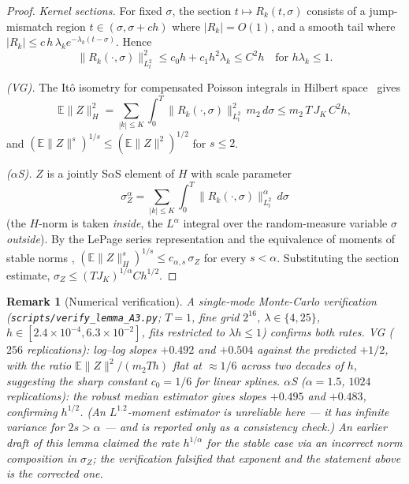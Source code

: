 \documentclass[review,12pt]{elsarticle}
\newtheorem{remark}{Remark}
\begin{document}
\begin{proof}
\emph{Kernel sections.} For fixed $\sigma$, the section
$t \mapsto R_k(t, \sigma)$ consists of a jump-mismatch region
$t \in (\sigma, \sigma + ch)$ where $|R_k| = O(1)$, and a smooth tail
where $|R_k| \le c\,h\,\lambda_k e^{-\lambda_k(t-\sigma)}$. Hence
\[
\|R_k(\cdot, \sigma)\|_{L^2_t}^2 \le c_0 h + c_1 h^2 \lambda_k
\le C^2 h
\quad\text{for } h\lambda_k \le 1.
\]

\emph{(VG).} The It\^o isometry for compensated Poisson integrals in
Hilbert space~\cite{PeszatZabczyk2007} gives
\[
\mathbb E\|Z\|_H^2 = \sum_{|k|\le K}\int_0^T
\|R_k(\cdot,\sigma)\|_{L^2_t}^2\, m_2\, d\sigma
\le m_2\, T\, J_K\, C^2 h,
\]
and $(\mathbb E\|Z\|^s)^{1/s} \le (\mathbb E\|Z\|^2)^{1/2}$ for
$s \le 2$.

\emph{($\alpha$S).} $Z$ is a jointly S$\alpha$S element of $H$ with
scale parameter
\[
\sigma_Z^\alpha = \sum_{|k| \le K}\int_0^T
\bigl\|R_k(\cdot, \sigma)\bigr\|_{L^2_t}^{\alpha}\, d\sigma
\]
(the $H$-norm is taken \emph{inside}, the $L^\alpha$ integral over
the random-measure variable $\sigma$ \emph{outside}). By the LePage
series representation and the equivalence of moments of stable norms
\cite[Ch.~3]{SamorodnitskyTaqqu1994}\cite[Ch.~5]{LedouxTalagrand1991},
$(\mathbb E\|Z\|_H^s)^{1/s} \le c_{\alpha,s}\,\sigma_Z$ for every
$s < \alpha$. Substituting the section estimate,
$\sigma_Z \le (T J_K)^{1/\alpha} C h^{1/2}$.
\end{proof}

\begin{remark}[Numerical verification]\label{rem:lemA3-verify}
A single-mode Monte-Carlo verification
(\texttt{scripts/verify\_lemma\_A3.py}; $T = 1$, fine grid $2^{16}$,
$\lambda \in \{4, 25\}$, $h \in [2.4\times 10^{-4},
6.3\times 10^{-2}]$, fits restricted to $\lambda h \le 1$) confirms
both rates. VG ($256$ replications): log--log slopes $+0.492$ and
$+0.504$ against the predicted $+1/2$, with the ratio
$\mathbb E\|Z\|^2/(m_2 T h)$ flat at $\approx 1/6$ across two decades
of $h$, suggesting the sharp constant $c_0 = 1/6$ for linear splines.
$\alpha$S ($\alpha = 1.5$, $1024$ replications): the robust median
estimator gives slopes $+0.495$ and $+0.483$, confirming $h^{1/2}$.
(An $L^{1.2}$-moment estimator is unreliable here — it has infinite
variance for $2s > \alpha$ — and is reported only as a consistency
check.) An earlier draft of this lemma claimed the rate
$h^{1/\alpha}$ for the stable case via an incorrect norm composition
in $\sigma_Z$; the verification falsified that exponent and the
statement above is the corrected one.
\end{remark}
\end{document}
